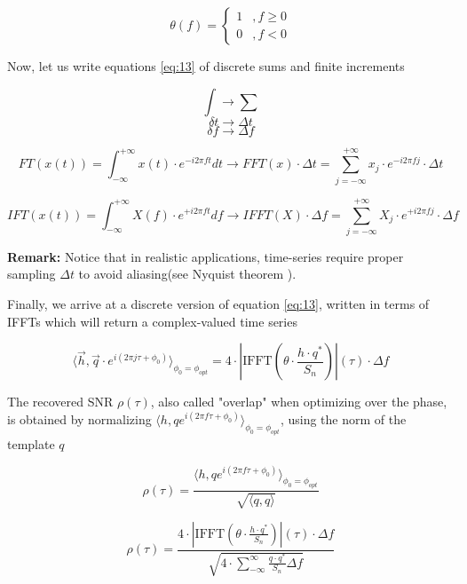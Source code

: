 \begin{equation}\label{eq:14}
\theta(f) = \begin{cases}
 1 &, f \geq 0 \\
 0 &, f < 0
\end{cases}
\end{equation}

Now, let us write equations \ref{eq:13} of discrete sums and finite increments

$$\int \rightarrow \sum $$
$$ \delta t \rightarrow \Delta t$$ 
$$\delta f \rightarrow \Delta f$$

\begin{equation}
FT(x(t))=\int_{-\infty}^{+\infty} x(t)\cdot e^{-i2\pi f t} dt \rightarrow  FFT(x)\cdot \Delta t = \sum_{j=-\infty}^{+\infty} x_j \cdot e^{-i2\pi f j} \cdot \Delta t
\end{equation}

\begin{equation}
IFT(x(t))=\int_{-\infty}^{+\infty} X(f)\cdot e^{+i2\pi f t} df \rightarrow  IFFT(X)\cdot \Delta f = \sum_{j=-\infty}^{+\infty} X_j \cdot e^{+i2\pi f j} \cdot \Delta f
\end{equation}


\textbf{Remark:} Notice that in realistic applications, time-series require proper sampling $\Delta t$ to avoid aliasing(see Nyquist theorem \cite{5055024}). 

Finally, we arrive at a discrete version of equation \ref{eq:13}, written in terms of IFFTs which will return a complex-valued time series

\begin{equation}\label{eq:15}
\langle \vec{h} ,\vec{q} \cdot e^{i(2\pi j \tau + \phi_0)} \rangle_{\phi_0=\phi_{opt}} =4\cdot \left| \mathrm{IFFT}\left(  \theta \cdot \frac{h \cdot q^{*} }{S_n} \right)\right|(\tau) \cdot \Delta f
\end{equation}


The recovered SNR $\rho(\tau)$, also called "overlap" when optimizing over the phase, is obtained by normalizing $\langle h,q e^{i(2\pi f \tau + \phi_0)} \rangle_{\phi_0=\phi_{opt}}$, using the norm of the template $q$

\begin{equation}
\rho (\tau) = \frac{\langle h,q e^{i(2\pi f \tau + \phi_0)} \rangle_{\phi_0=\phi_{opt}}}{\sqrt{\langle q,q \rangle}}
\end{equation}


\begin{equation}\label{eq:17}
\rho (\tau)= 
\frac{
4\cdot \left| \mathrm{IFFT}\left(  \theta \cdot \frac{h \cdot q^{*} }{S_n}\right)\right| (\tau) \cdot \Delta f
}
{
\sqrt{4\cdot \sum_{-\infty}^{\infty} \frac{q\cdot q^*}{S_n} \Delta f}
}
\end{equation}

